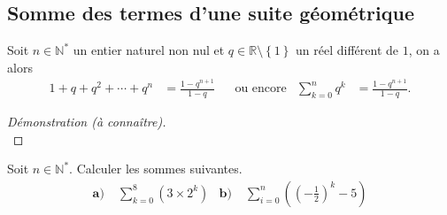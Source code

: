 \documentclass[11pt]{article}
\begin{document}
\subsection{Somme des termes d'une suite géométrique}
\begin{thm}
  Soit $n\in\mathbb{N}^*$ un entier naturel non nul et
  $q\in\mathbb{R}\setminus\left\{ 1 \right\}$ un réel différent de $1$, on a
  alors
  \begin{align*}
    1+q+q^2+\cdots+q^n &= \frac{1-q^{n+1}}{1-q} &
    &\text{ou encore} &
    \sum_{k=0}^n q^k &= \frac{1-q^{n+1}}{1-q}.
  \end{align*}
\end{thm}
\begin{proof}[Démonstration (à connaître)]
  ~\vspace{4cm}\\
\end{proof}
\begin{app}
  Soit $n\in\mathbb{N}^*$. Calculer les sommes suivantes.
  \begin{align*}
    \textbf{a)}\;& \sum_{k=0}^{8} \left( 3\times2^k \right) &
    \textbf{b)}\;& \sum_{i=0}^{n} \left( \left( -\frac{1}{2} \right)^k-5\right)
  \end{align*}
\end{app}
\end{document}
